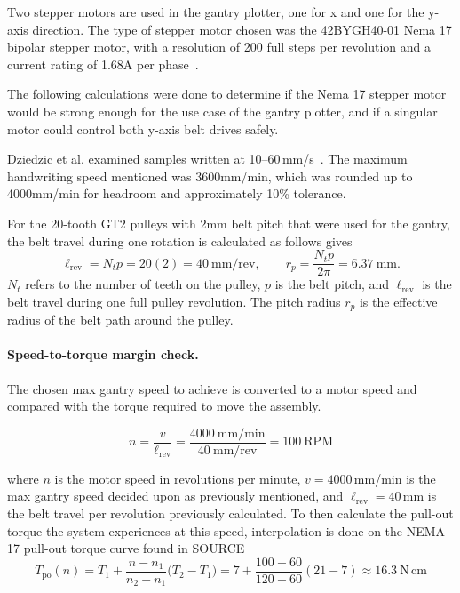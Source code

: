 Two stepper motors are used in the gantry plotter, one for x and one for the y-axis direction. The type of stepper motor chosen was the 42BYGH40-01 Nema 17 bipolar stepper motor, with a resolution of 200 full steps per revolution and a current rating of 1.68A per phase~\cite{stepperds}. 

The following calculations were done to determine if the Nema 17 stepper motor would be strong enough for the use case of the gantry plotter, and if a singular motor could control both y-axis belt drives safely.

Dziedzic et al. examined samples written at 10--60\,mm/s~\cite{dziedzic2026}. The maximum handwriting speed mentioned was 3600mm/min, which was rounded up to 4000mm/min for headroom and approximately 10\% tolerance. 

For the 20-tooth GT2 pulleys with 2mm belt pitch that were used for the gantry, the belt travel during one rotation is calculated as follows gives~\cite{acarnley2002}
\begin{equation}
\ell_{\mathrm{rev}}=N_t p=20(2)=40\ \mathrm{mm/rev},\qquad
r_p=\frac{N_t p}{2\pi}=6.37\ \mathrm{mm}.
\label{eq:des-pulley}
\end{equation}
$N_t$ refers to the number of teeth on the pulley, $p$ is the belt pitch, and $\ell_{\mathrm{rev}}$ is the belt travel during one full pulley revolution. The pitch radius $r_p$ is the effective radius of the belt path around the pulley.

\paragraph{Speed-to-torque margin check.}
The chosen max gantry speed to achieve is converted to a motor speed and compared with the torque required to move the assembly. 

\begin{equation}
n = \frac{v}{\ell_{\mathrm{rev}}} = \frac{4000\ \mathrm{mm/min}}{40\ \mathrm{mm/rev}} = 100\ \mathrm{RPM}
\label{eq:gan-rpm}
\end{equation}

where $n$ is the motor speed in revolutions per minute, $v=4000$\,mm/min is the max gantry speed decided upon as previously mentioned, and $\ell_{\mathrm{rev}}=40$\,mm is the belt travel per revolution previously calculated. To then calculate the pull-out torque the system experiences at this speed, interpolation is done on the NEMA 17 pull-out torque curve found in SOURCE
\begin{equation}
T_{\mathrm{po}}(n) = T_1 + \frac{n-n_1}{n_2-n_1}\bigl(T_2-T_1\bigr) = 7 + \frac{100-60}{120-60}(21-7) \approx 16.3\ \mathrm{N\,cm}
\label{eq:gan-pullout}
\end{equation}

